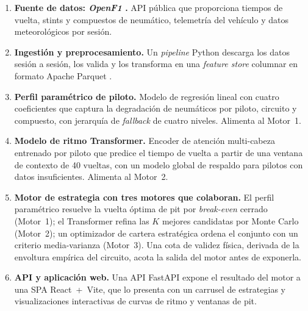 \begin{enumerate}
    \item \textbf{Fuente de datos: \textit{OpenF1} \cite{openf1api}.} API pública que proporciona tiempos de vuelta, stints y compuestos de neumático, telemetría del vehículo y datos meteorológicos por sesión.

    \item \textbf{Ingestión y preprocesamiento.} Un \textit{pipeline} Python descarga los datos sesión a sesión, los valida y los transforma en una \textit{feature store} columnar en formato Apache Parquet \cite{parquet}.

    \item \textbf{Perfil paramétrico de piloto.} Modelo de regresión lineal con cuatro coeficientes que captura la degradación de neumáticos por piloto, circuito y compuesto, con jerarquía de \textit{fallback} de cuatro niveles. Alimenta al Motor~1.

    \item \textbf{Modelo de ritmo Transformer.} Encoder de atención multi-cabeza entrenado por piloto que predice el tiempo de vuelta a partir de una ventana de contexto de 40 vueltas, con un modelo global de respaldo para pilotos con datos insuficientes. Alimenta al Motor~2.

    \item \textbf{Motor de estrategia con tres motores que colaboran.} El perfil paramétrico resuelve la vuelta óptima de pit por \textit{break-even} cerrado (Motor~1); el Transformer refina las $K$ mejores candidatas por Monte Carlo (Motor~2); un optimizador de cartera estratégica ordena el conjunto con un criterio media-varianza (Motor~3). Una cota de validez física, derivada de la envoltura empírica del circuito, acota la salida del motor antes de exponerla.

    \item \textbf{API y aplicación web.} Una API FastAPI expone el resultado del motor a una SPA React~+~Vite, que lo presenta con un carrusel de estrategias y visualizaciones interactivas de curvas de ritmo y ventanas de pit.
\end{enumerate}

